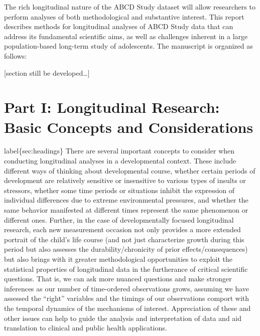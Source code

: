 \documentclass[
  10pt,
  letterpaper,
]{article}
\begin{document}
The rich longitudinal nature of the ABCD Study dataset will allow
researchers to perform analyses of both methodological and substantive
interest. This report describes methods for longitudinal analyses of
ABCD Study data that can address its fundamental scientific aims, as
well as challenges inherent in a large population-based long-term study
of adolescents. The manuscript is organized as follows:

{[}section still be developed\ldots{]}

\hypertarget{part-i-longitudinal-research-basic-concepts-and-considerations}{%
\section{Part I: Longitudinal Research: Basic Concepts and
Considerations}\label{part-i-longitudinal-research-basic-concepts-and-considerations}}

label\{sec:headings\} There are several important concepts to consider
when conducting longitudinal analyses in a developmental context. These
include different ways of thinking about developmental course, whether
certain periods of development are relatively sensitive or insensitive
to various types of insults or stressors, whether some time periods or
situations inhibit the expression of individual differences due to
extreme environmental pressures, and whether the same behavior
manifested at different times represent the same phenomenon or different
ones. Further, in the case of developmentally focused longitudinal
research, each new measurement occasion not only provides a more
extended portrait of the child's life course (and not just characterize
growth during this period but also assesses the durability/chronicity of
prior effects/consequences) but also brings with it greater
methodological opportunities to exploit the statistical properties of
longitudinal data in the furtherance of critical scientific questions.
That is, we can ask more nuanced questions and make stronger inferences
as our number of time-ordered observations grows, assuming we have
assessed the ``right'' variables and the timings of our observations
comport with the temporal dynamics of the mechanisms of interest.
Appreciation of these and other issues can help to guide the analysis
and interpretation of data and aid translation to clinical and public
health applications.
\end{document}
